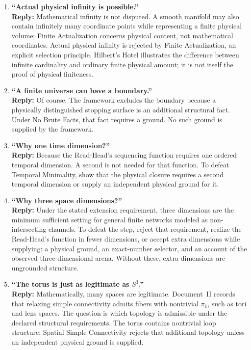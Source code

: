 \documentclass[11pt]{article}
\theoremstyle{canonstyle}
\begin{document}
\begin{enumerate}
\newpage

    \item \textbf{``Actual physical infinity is possible.''} \\
    \textbf{Reply:} Mathematical infinity is not disputed. A smooth manifold may also contain infinitely many coordinate points while representing a finite physical volume; Finite Actualization concerns physical content, not mathematical coordinates. Actual physical infinity is rejected by Finite Actualization, an explicit selection principle. Hilbert's Hotel illustrates the difference between infinite cardinality and ordinary finite physical amount; it is not itself the proof of physical finiteness.

    \item \textbf{``A finite universe can have a boundary.''} \\
    \textbf{Reply:} Of course. The framework excludes the boundary because a physically distinguished stopping surface is an additional structural fact. Under No Brute Facts, that fact requires a ground. No such ground is supplied by the framework.

    \item \textbf{``Why one time dimension?''} \\
    \textbf{Reply:} Because the Read-Head's sequencing function requires one ordered temporal dimension. A second is not needed for that function. To defeat Temporal Minimality, show that the physical closure requires a second temporal dimension or supply an independent physical ground for it.

    \item \textbf{``Why three space dimensions?''} \\
    \textbf{Reply:} Under the stated extension requirement, three dimensions are the minimum sufficient setting for general finite networks modeled as non-intersecting channels. To defeat the step, reject that requirement, realize the Read-Head's function in fewer dimensions, or accept extra dimensions while supplying: a physical ground, an exact-number selector, and an account of the observed three-dimensional arena. Without these, extra dimensions are ungrounded structure.

    \item \textbf{``The torus is just as legitimate as $S^3$.''} \\
    \textbf{Reply:} Mathematically, many spaces are legitimate. Document~II records that relaxing simple connectivity admits fibers with nontrivial $\pi_1$, such as tori and lens spaces. The question is which topology is admissible under the declared structural requirements. The torus contains nontrivial loop structure; Spatial Simple Connectivity rejects that additional topology unless an independent physical ground is supplied.


\end{enumerate}
\end{document}
